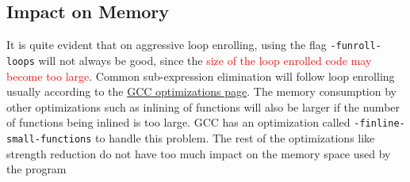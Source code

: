 \documentclass[a4paper, 12pt]{article}
\begin{document}
\subsection{Impact on Memory}
It is quite evident that on aggressive loop enrolling, using the flag \verb|-funroll-loops| will not always be good, since the \textcolor{red}{size of the loop enrolled code may become too large}. Common sub-expression elimination will follow loop enrolling usually according to the \href{https://gcc.gnu.org/onlinedocs/gcc-4.5.2/gcc/Optimize-Options.html}{GCC optimizations page}.
The memory consumption by other optimizations such as inlining of functions will also be larger if the number of functions being inlined is too large.  GCC has an optimization called \verb|-finline-small-functions| to handle this problem. The rest of the optimizations like strength reduction do not have too much impact on the memory space used by the program
\newpage


\end{document}
